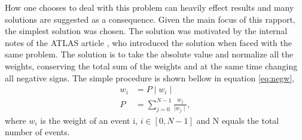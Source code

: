 How one chooses to deal with this problem can heavily effect results and many solutions 
are suggested as a consequence. Given the main focus of this rapport, the 
simplest solution was chosen. The solution was motivated by the internal notes of 
the \ac{ATLAS} article \cite{Aad:2800889}, who introduced the solution when faced with the same 
problem. The solution is to take the absolute value and normalize all the weights, conserving 
the total sum of the weights and at the same time changing all negative signs. The simple procedure 
is shown bellow in equation \ref{eq:negw},
\begin{align}\label{eq:negw}
    w_i & = P \mid w_i \mid\,  \\
    P  & =  \sum_{j=0}^{N-1}\frac{ w_j}{\mid w_j \mid},
\end{align}
where $w_i$ is the weight of an event i, $i \in [0,N-1]$ and N equals the total number of events.



